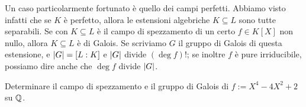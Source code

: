 \begin{osse}
Un caso particolarmente fortunato è quello dei campi perfetti. Abbiamo visto infatti che se \(K\) è perfetto, allora le estensioni algebriche \(K \subseteq L\) sono tutte separabili. Se con \(K \subseteq L\) è il campo di spezzamento di un certo \(f \in K[X]\) non nullo, allora \(K \subseteq L\) è di Galois. Se scriviamo \(G\) il gruppo di Galois di questa estensione, e \(\left\lvert G\right\rvert = [L:K]\) e \(\left\lvert G\right\rvert\) divide \((\deg f)!\); se inoltre \(f\) è pure irriducibile, possiamo dire anche che \(\deg f\) divide \(\left\lvert G\right\rvert\).
\end{osse}


\begin{eser}
Determinare il campo di spezzamento e il gruppo di Galois di \(f := X^4-4X^2+2\) su \(\mathbb{Q}\).
\end{eser}

